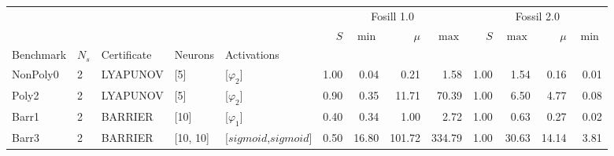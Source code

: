 \begin{tabular}{lllllrrrrrrrr}
    \toprule
              &       &             &          &                       & \multicolumn{4}{c}{Fosill 1.0} & \multicolumn{4}{c}{Fossil 2.0}                                                    \\
              &       &             &          &                       & $S$                            & $\min$                         & $\mu$  & $\max$ & $S$  & $\max$ & $\mu$ & $\min$ \\
    Benchmark & $N_s$ & Certificate & Neurons  & Activations           &                                &                                &        &        &      &        &       &        \\
    \midrule
    NonPoly0  & 2     & LYAPUNOV    & [5]      & [$\varphi_{2}$]       & 1.00                           & 0.04                           & 0.21   & 1.58   & 1.00 & 1.54   & 0.16  & 0.01   \\
    \cline{1-13} \cline{2-13} \cline{3-13} \cline{4-13}
    Poly2     & 2     & LYAPUNOV    & [5]      & [$\varphi_{2}$]       & 0.90                           & 0.35                           & 11.71  & 70.39  & 1.00 & 6.50   & 4.77  & 0.08   \\
    \cline{1-13} \cline{2-13} \cline{3-13} \cline{4-13}
    Barr1     & 2     & BARRIER     & [10]     & [$\varphi_{1}$]       & 0.40                           & 0.34                           & 1.00   & 2.72   & 1.00 & 0.63   & 0.27  & 0.02   \\
    \cline{1-13} \cline{2-13} \cline{3-13} \cline{4-13}
    Barr3     & 2     & BARRIER     & [10, 10] & [$sigmoid$,$sigmoid$] & 0.50                           & 16.80                          & 101.72 & 334.79 & 1.00 & 30.63  & 14.14 & 3.81   \\
    \cline{1-13} \cline{2-13} \cline{3-13} \cline{4-13}
    \bottomrule
\end{tabular}
